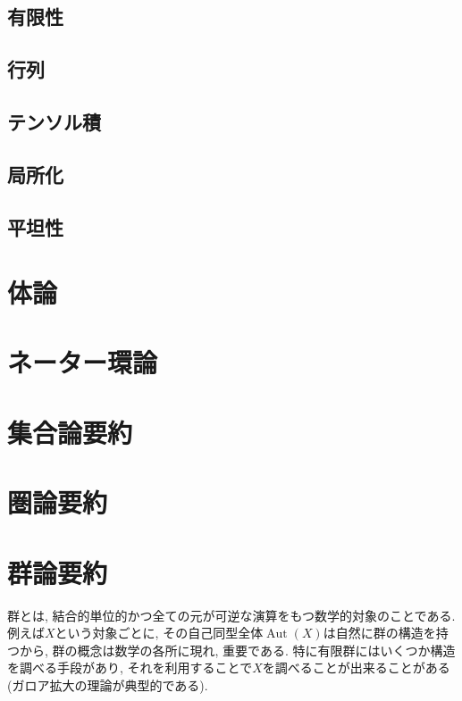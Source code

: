 \documentclass[a4paper, twoside]{bxjsarticle}
\DeclareMathOperator{\Aut}{Aut}
\theoremstyle{definition}
\begin{document}
        \subsection{有限性}
        \subsection{行列}
        \subsection{テンソル積}
        \subsection{局所化}
        \subsection{平坦性}
        



    \cleardoublepage
    \section{体論}
    \section{ネーター環論}

    
    \appendix
    \def\thesection{\Alph{section}}
    \section{集合論要約}
    \section{圏論要約}


    \cleardoublepage
    \section{群論要約}
    群とは, 結合的単位的かつ全ての元が可逆な演算をもつ数学的対象のことである.
    例えば$X$という対象ごとに, その自己同型全体$\Aut(X)$は自然に群の構造を持つから, 群の概念は数学の各所に現れ, 重要である.
    特に有限群にはいくつか構造を調べる手段があり, それを利用することで$X$を調べることが出来ることがある(ガロア拡大の理論が典型的である).
\end{document}
